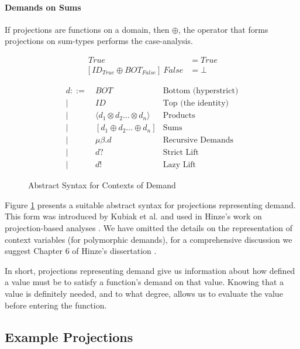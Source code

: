 \paragraph{Demands on Sums} If projections are functions on a domain, then
$\oplus$, the operator that forms projections on sum-types performs the case-analysis.

\begin{align*}
[ID_{True} \oplus ID_{False}]  \ True &= True \\
[ID_{True} \oplus BOT_{False}] \ False &= \bot
\end{align*}

\begin{figure}
\begin{align*}
    d ::=&\ BOT              & \text{Bottom (hyperstrict)} \\
        |&\ ID               & \text{Top (the identity)} \\
        |&\ \langle d_{1} \otimes d_{2} \dots \otimes d_{n} \rangle   & \text{Products} \\ 
        |&\ [d_{1} \oplus d_{2} \dots \oplus d_{n}]    & \text{Sums} \\ 
        |&\ \mu\beta . d     & \text{Recursive Demands} \\
        |&\ d?               & \text{Strict Lift} \\
        |&\ d!               & \text{Lazy Lift}
\end{align*}
\caption{Abstract Syntax for Contexts of Demand}
\label{fig:ContextAST}
\end{figure}


Figure \ref{fig:ContextAST} presents a suitable abstract syntax for projections
representing demand.  This form was introduced by Kubiak et al. and used in
Hinze's work on projection-based analyses \citep{kubiak, hinze1995projection}.
We have omitted the details on the representation of context variables (for
polymorphic demands), for a comprehensive discussion we suggest Chapter 6 of Hinze's
dissertation \citep{hinze1995projection}.

In short, projections representing demand give us information about how defined
a value must be to satisfy a function's demand on that value. Knowing that a
value is definitely needed, and to what degree, allows us to evaluate the value
before entering the function.

\subsection*{Example Projections}

